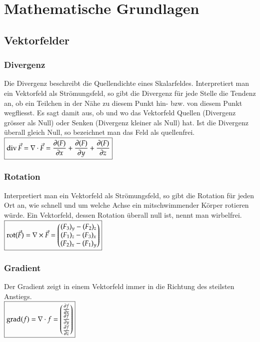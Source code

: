\section{Mathematische Grundlagen}
\subsection{Vektorfelder}
\subsubsection{Divergenz}
	Die Divergenz beschreibt die Quellendichte eines Skalarfeldes. 
	Interpretiert man ein Vektorfeld als Strömungsfeld, so gibt die Divergenz für jede
	Stelle die Tendenz an, ob ein Teilchen in der Nähe zu diesem Punkt hin- bzw.
	von diesem Punkt wegfliesst. Es sagt damit aus, ob und wo das Vektorfeld Quellen
	(Divergenz grösser als Null) oder Senken (Divergenz kleiner als Null) hat. Ist
	die Divergenz überall gleich Null, so bezeichnet man das Feld als quellenfrei.\\
	
	$\boxed{\operatorname{div} \vec{F}=\nabla \cdot \vec{F}= \frac{\partial(F)}{\partial x}+\frac{\partial(F)}{\partial y}+\frac{\partial(F)}{\partial z}}$	
\subsubsection{Rotation}
Interpretiert man ein Vektorfeld als Strömungsfeld, so gibt die Rotation für jeden
Ort an, wie schnell und um welche Achse ein mitschwimmender Körper rotieren
würde. Ein Vektorfeld, dessen Rotation überall null ist, nennt man wirbelfrei.\\

$\boxed{\operatorname{rot}(\vec F)=\nabla\times\vec{F} = 
	\begin{pmatrix}
	(F_3)_y - (F_2)_z\\
	(F_1)_z - (F_3)_x\\
	(F_2)_x - (F_1)_y
	\end{pmatrix}}$
\subsubsection{Gradient}
Der Gradient zeigt in einem Vektorfeld immer in die Richtung des steilsten Anstiegs. \\

$\boxed{\operatorname{grad}(f)= \nabla \cdot f= 	
	\begin{pmatrix}
	\frac{\partial f}{\partial x}\\
	\frac{\partial f}{\partial y}\\
	\frac{\partial f}{\partial z}
	\end{pmatrix}}$
